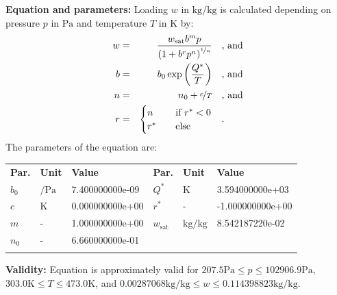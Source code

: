 \textbf{Equation and parameters:}
\newline
%
Loading $w$ in $\si{\kilogram\per\kilogram}$ is calculated depending on pressure $p$ in $\si{\pascal}$ and temperature $T$ in $\si{\kelvin}$ by:
%
\begin{equation*}
\begin{split}
w &=& \frac{w_\mathrm{sat} b^{m} p}{\left( 1 + b^{r} p^{n} \right)^{\nicefrac{1}{n}}} & \quad\text{, and} \\
b &=& b_0 \exp\left( \frac{Q^{*}}{T} \right) & \quad\text{, and} \\
n &=& n_0 + \nicefrac{c}{T} & \quad\text{, and} \\
r &=& \begin{cases} n & \quad \text{if } r^{*} < 0 \\ r^{*}  & \quad \text{else} \end{cases} & \quad\text{.}
\end{split}
\end{equation*}
%
The parameters of the equation are:
%
\begin{longtable}[l]{lll|lll}
\toprule
\addlinespace
\textbf{Par.} & \textbf{Unit} & \textbf{Value} &	\textbf{Par.} & \textbf{Unit} & \textbf{Value} \\
\addlinespace
\midrule
\endhead

\bottomrule
\endfoot
\bottomrule
\endlastfoot
\addlinespace

$b_0$ & $\si{\per\pascal}$ & 7.400000000e-09 & $Q^{*}$ & $\si{\kelvin}$ & 3.594000000e+03 \\
$c$ & $\si{\kelvin}$ & 0.000000000e+00 & $r^{*}$ & - & -1.000000000e+00 \\
$m$ & - & 1.000000000e+00 & $w_\mathrm{sat}$ & $\si{\kilogram\per\kilogram}$ & 8.542187220e-02 \\
$n_0$ & - & 6.660000000e-01 & & & \\

\addlinespace\end{longtable}

\textbf{Validity:}
\newline
Equation is approximately valid for $207.5 \si{\pascal} \leq p \leq 102906.9 \si{\pascal}$,  $303.0 \si{\kelvin} \leq T \leq 473.0 \si{\kelvin}$, and $0.00287068 \si{\kilogram\per\kilogram} \leq w \leq 0.114398823 \si{\kilogram\per\kilogram}$.
\newline

